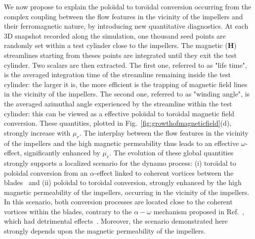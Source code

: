 \documentclass[aps,prl,twocolumn,showpacs,amsmath,amssymb]{revtex4-1}%
\begin{document}
We now propose to explain the polo\"\i dal to toro\"\i dal conversion occurring from the complex coupling between the flow features in the vicinity of the impellers and their ferromagnetic nature, by introducing new quantitative diagnostics. At each 3D snapshot recorded along the simulation, one thousand seed points are randomly set within a test cylinder close to the impellers.  The magnetic ($\mathbf{H}$) streamlines starting from theses points are integrated until they exit the test cylinder. 
Two scalars are then extracted. The first one, referred to as "life time", is the averaged integration time of the streamline remaining inside the test cylinder: the larger it is, the more efficient is the trapping of magnetic field lines in the vicinity of the impellers. The second one, referred to as "winding angle", is the averaged azimuthal angle experienced by the streamline within the test cylinder: this can be viewed as a effective polo\"\i dal to toro\"\i dal magnetic field conversion.
These quantities, plotted in Fig.~\ref{fig:growthofmagneticfield}(d), strongly increase with $\mu_r$. The interplay between the flow features in the vicinity of the impellers and the high magnetic permeability thus leads to an effective $\omega$-effect, significantly enhanced by $\mu_r$.
The evolution of these global quantities strongly supports a localized scenario for the dynamo process: (i) toro\"\i dal to polo\"\i dal conversion from  an $\alpha$-effect linked to coherent vortices between the blades~\cite{paper:petrelis:2007,paper:laguerre:2008,paper:varela:2017} and (ii) polo\"\i dal to toro\"\i dal conversion, strongly enhanced by the high magnetic permeability of the impellers, occurring in the vicinity of the impellers. In this scenario, both conversion processes are located close to the coherent vortices within the blades, contrary to the $\alpha-\omega$ mechanism proposed in Ref.~\cite{paper:petrelis:2007}, which had detrimental effects~\cite{paper:laguerre:2008}. Moreover, the scenario demonstrated here strongly depends upon the magnetic permeability of the impellers.
 


\vspace{.2 cm}

%
\end{document}
